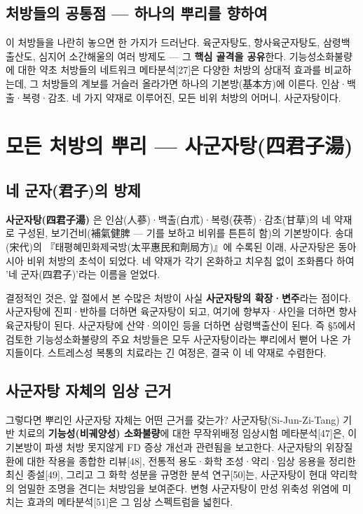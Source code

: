 \documentclass[11pt,oneside]{book}
\begin{document}
\subsection{처방들의 공통점 — 하나의 뿌리를 향하여}
이 처방들을 나란히 놓으면 한 가지가 드러난다. 육군자탕도, 향사육군자탕도, 삼령백출산도, 심지어 소간해울의 여러 방제도 — 그 \textbf{핵심 골격을 공유}한다. 기능성소화불량에 대한 약초 처방들의 네트워크 메타분석[27]은 다양한 처방의 상대적 효과를 비교하는데, 그 처방들의 계보를 거슬러 올라가면 하나의 기본방(基本方)에 이른다. 인삼·백출·복령·감초. 네 가지 약재로 이루어진, 모든 비위 처방의 어머니. 사군자탕이다.

\section{모든 처방의 뿌리 — 사군자탕(四君子湯)}
\subsection{네 군자(君子)의 방제}
\textbf{사군자탕(四君子湯)} 은 인삼(人蔘)·백출(白朮)·복령(茯苓)·감초(甘草)의 네 약재로 구성된, 보기건비(補氣健脾 — 기를 보하고 비위를 튼튼히 함)의 기본방이다. 송대(宋代)의 『태평혜민화제국방(太平惠民和劑局方)』에 수록된 이래, 사군자탕은 동아시아 비위 처방의 초석이 되었다. 네 약재가 각기 온화하고 치우침 없이 조화롭다 하여 '네 군자(四君子)'라는 이름을 얻었다.

결정적인 것은, 앞 절에서 본 수많은 처방이 사실 \textbf{사군자탕의 확장·변주}라는 점이다. 사군자탕에 진피·반하를 더하면 육군자탕이 되고, 여기에 향부자·사인을 더하면 향사육군자탕이 된다. 사군자탕에 산약·의이인 등을 더하면 삼령백출산이 된다. 즉 §5에서 검토한 기능성소화불량의 주요 처방들은 모두 사군자탕이라는 뿌리에서 뻗어 나온 가지들이다. 스트레스성 복통의 치료라는 긴 여정은, 결국 이 네 약재로 수렴한다.

\subsection{사군자탕 자체의 임상 근거}
그렇다면 뿌리인 사군자탕 자체는 어떤 근거를 갖는가? 사군자탕(Si-Jun-Zi-Tang) 기반 치료의 \textbf{기능성(비궤양성) 소화불량}에 대한 무작위배정 임상시험 메타분석[47]은, 이 기본방이 파생 처방 못지않게 FD 증상 개선과 관련됨을 보고한다. 사군자탕의 위장질환에 대한 작용을 종합한 리뷰[48], 전통적 용도·화학 조성·약리·임상 응용을 정리한 최신 종설[49], 그리고 그 화학 성분을 규명한 분석 연구[50]는, 사군자탕이 현대 약리학의 엄밀한 조명을 견디는 처방임을 보여준다. 변형 사군자탕이 만성 위축성 위염에 미치는 효과의 메타분석[51]은 그 임상 스펙트럼을 넓힌다.
\end{document}
